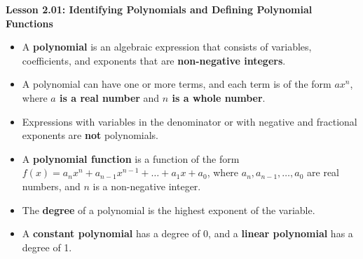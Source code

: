 \begin{center}
\textbf{Lesson 2.01: Identifying Polynomials and Defining Polynomial Functions}
\end{center}

\vspace*{-1.5ex}

\begin{itemize}
    \item A \textbf{polynomial} is an algebraic expression that consists of variables, coefficients, and exponents that are \textbf{non-negative integers}.
    \item A polynomial can have one or more terms, and each term is of the form $ax^n$, where \textbf{$a$ is a real number} and \textbf{$n$ is a whole number}.
    \item Expressions with variables in the denominator or with negative and fractional exponents are \textbf{not} polynomials.
    \item A \textbf{polynomial function} is a function of the form $f(x) = a_nx^n + a_{n-1}x^{n-1} + \dots + a_1x + a_0$, where $a_n, a_{n-1}, \dots, a_0$ are real numbers, and $n$ is a non-negative integer.
    \item The \textbf{degree} of a polynomial is the highest exponent of the variable.
    \item A \textbf{constant polynomial} has a degree of 0, and a \textbf{linear polynomial} has a degree of 1.
\end{itemize}
